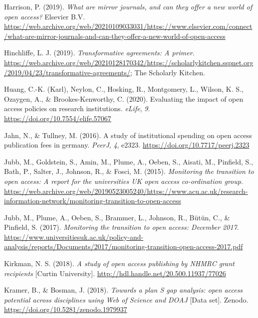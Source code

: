\documentclass[a4paper,man,floatsintext,longtable,noextraspace,12pt]{apa6}
\newenvironment{CSLReferences}%
  {}%
  {\par}
\begin{document}
\begin{CSLReferences}{1}{0}
\leavevmode\hypertarget{ref-Harrison_2019}{}%
Harrison, P. (2019). \emph{What are mirror journals, and can they offer
a new world of open access?} Elsevier B.V.
\url{https://web.archive.org/web/20210109033031/https://www.elsevier.com/connect/what-are-mirror-journals-and-can-they-offer-a-new-world-of-open-access}

\leavevmode\hypertarget{ref-Hinchliffe_2019}{}%
Hinchliffe, L. J. (2019). \emph{Transformative agreements: A primer}.
\url{https://web.archive.org/web/20210128170342/https://scholarlykitchen.sspnet.org/2019/04/23/transformative-agreements/};
The Scholarly Kitchen.

\leavevmode\hypertarget{ref-Huang_2020}{}%
Huang, C.-K. (Karl), Neylon, C., Hosking, R., Montgomery, L., Wilson, K.
S., Ozaygen, A., \& Brookes-Kenworthy, C. (2020). Evaluating the impact
of open access policies on research institutions. \emph{{eLife}},
\emph{9}. \url{https://doi.org/10.7554/elife.57067}

\leavevmode\hypertarget{ref-Jahn_2016}{}%
Jahn, N., \& Tullney, M. (2016). A study of institutional spending on
open access publication fees in germany. \emph{{PeerJ}}, \emph{4},
e2323. \url{https://doi.org/10.7717/peerj.2323}

\leavevmode\hypertarget{ref-Jubb_2015}{}%
Jubb, M., Goldstein, S., Amin, M., Plume, A., Oeben, S., Aisati, M.,
Pinfield, S., Bath, P., Salter, J., Johnson, R., \& Fosci, M. (2015).
\emph{Monitoring the transition to open access: A report for the
universities UK open access co-ordination group}.
\url{https://web.archive.org/web/20190523005240/https://www.acu.ac.uk/research-information-network/monitoring-transition-to-open-access}

\leavevmode\hypertarget{ref-Jubb_2017}{}%
Jubb, M., Plume, A., Oeben, S., Brammer, L., Johnson, R., Bütün, C., \&
Pinfield, S. (2017). \emph{Monitoring the transition to open access:
December 2017}.
\url{https://www.universitiesuk.ac.uk/policy-and-analysis/reports/Documents/2017/monitoring-transition-open-access-2017.pdf}

\leavevmode\hypertarget{ref-Kirkman_2018}{}%
Kirkman, N. S. (2018). \emph{A study of open access publishing by NHMRC
grant recipients} {[}{Curtin University}{]}.
\url{http://hdl.handle.net/20.500.11937/77026}

\leavevmode\hypertarget{ref-Kramer_2018}{}%
Kramer, B., \& Bosman, J. (2018). \emph{{Towards a plan S gap analysis:
open access potential across disciplines using Web of Science and DOAJ}}
{[}Data set{]}. Zenodo. \url{https://doi.org/10.5281/zenodo.1979937}


\end{CSLReferences}
\end{document}
